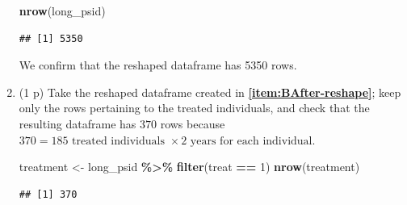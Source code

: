 \documentclass[
]{article}
\newenvironment{Shaded}{\begin{snugshade}}{\end{snugshade}}
\newcommand{\DecValTok}[1]{\textcolor[rgb]{0.00,0.00,0.81}{#1}}
\newcommand{\FunctionTok}[1]{\textcolor[rgb]{0.13,0.29,0.53}{\textbf{#1}}}
\newcommand{\NormalTok}[1]{#1}
\newcommand{\OtherTok}[1]{\textcolor[rgb]{0.56,0.35,0.01}{#1}}
\newcommand{\SpecialCharTok}[1]{\textcolor[rgb]{0.81,0.36,0.00}{\textbf{#1}}}
\newcommand{\StringTok}[1]{\textcolor[rgb]{0.31,0.60,0.02}{#1}}
\begin{document}
\begin{enumerate}
\begin{Shaded}
\end{Shaded}

\begin{Shaded}
\begin{Highlighting}[]
\FunctionTok{nrow}\NormalTok{(long\_psid)}
\end{Highlighting}
\end{Shaded}

\begin{verbatim}
## [1] 5350
\end{verbatim}

  We confirm that the reshaped dataframe has 5350 rows.
\item
  (1 p) Take the reshaped dataframe created in
  \textbf{\ref{item:BAfter-reshape}}; keep only the rows pertaining to
  the treated individuals, and check that the resulting dataframe has
  \(370\) rows because
  \(370=185 \text{ treated individuals } \times 2 \text{ years for each individual}\).\label{item:BAfter-filter}

\begin{Shaded}
\begin{Highlighting}[]
\NormalTok{treatment }\OtherTok{\textless{}{-}}\NormalTok{ long\_psid }\SpecialCharTok{\%\textgreater{}\%} \FunctionTok{filter}\NormalTok{(treat }\SpecialCharTok{==} \DecValTok{1}\NormalTok{)}
\FunctionTok{nrow}\NormalTok{(treatment)}
\end{Highlighting}
\end{Shaded}

\begin{verbatim}
## [1] 370
\end{verbatim}


\end{enumerate}
\end{document}
